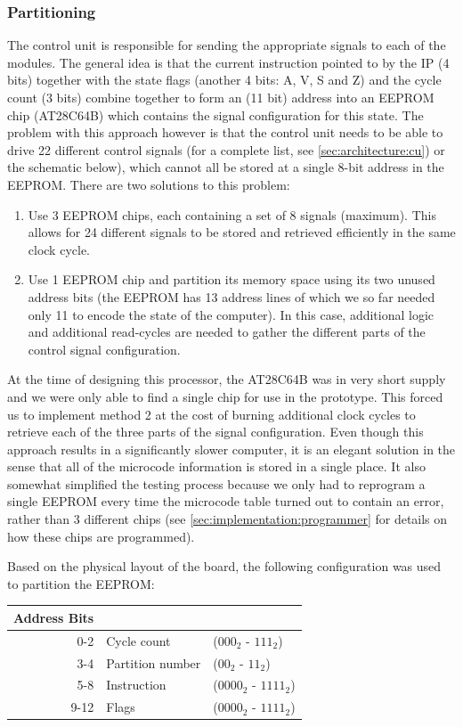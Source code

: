 \subsubsection{Partitioning}
The control unit is responsible for sending the appropriate signals to each of the modules. The general idea is that the current instruction pointed to by the IP (4 bits) together with the state flags (another 4 bits: A, V, S and Z) and the cycle count (3 bits) combine together to form an (11 bit) address into an EEPROM chip (AT28C64B) which contains the signal configuration for this state. The problem with this approach however is that the control unit needs to be able to drive 22 different control signals (for a complete list, see \ref{sec:architecture:cu}) or the schematic below), which cannot all be stored at a single 8-bit address in the EEPROM. There are two solutions to this problem:
\begin{enumerate}
\item Use 3 EEPROM chips, each containing a set of 8 signals (maximum). This allows for 24 different signals to be stored and retrieved efficiently in the same clock cycle.
\item Use 1 EEPROM chip and partition its memory space using its two unused address bits (the EEPROM has 13 address lines of which we so far needed only 11 to encode the state of the computer). In this case, additional logic and additional read-cycles are needed to gather the different parts of the control signal configuration.
\end{enumerate}

At the time of designing this processor, the AT28C64B was in very short supply and we were only able to find a single chip for use in the prototype. This forced us to implement method 2 at the cost of burning additional clock cycles to retrieve each of the three parts of the signal configuration. Even though this approach results in a significantly slower computer, it is an elegant solution in the sense that all of the microcode information is stored in a single place. It also somewhat simplified the testing process because we only had to reprogram a single EEPROM every time the microcode table turned out to contain an error, rather than 3 different chips (see \ref{sec:implementation:programmer} for details on how these chips are programmed).

Based on the physical layout of the board, the following configuration was used to partition the EEPROM:
\\
\begin{center}
\begin{tabular}{r|ll} 
  Address Bits & \\ \hline
  0-2  & Cycle count & ($000_2$ - $111_2$) \\
  3-4  & Partition number & ($00_2$ - $11_2$) \\
  5-8  & Instruction & ($0000_2$ - $1111_2$) \\
  9-12 & Flags & ($0000_2$ - $1111_2$) \\
\end{tabular}
\end{center}

